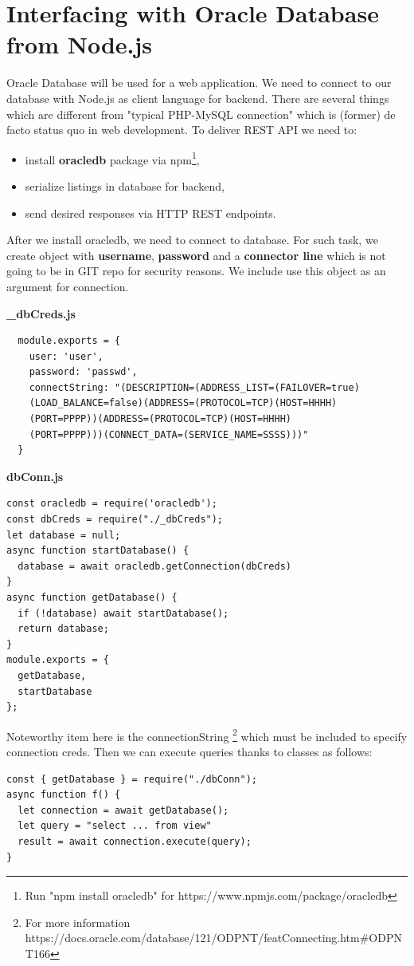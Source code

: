 \documentclass{article}
\begin{document}
\section{Interfacing with Oracle Database from Node.js}
Oracle Database will be used for a web application. We need to connect to our database with Node.js as client language for backend. There are several things which are different from "typical PHP-MySQL connection" which is (former) de facto status quo in web development. To deliver REST API we need to: 
\begin{itemize}
\item install \textbf{oracledb} package via npm\footnote{Run "npm install oracledb" for https://www.npmjs.com/package/oracledb},
\item serialize listings in database for backend,
\item send desired responses via HTTP REST endpoints.
\end{itemize}
After we install oracledb, we need to connect to database. For such task, we create object with \textbf{username}, \textbf{password} and a \textbf{connector line} which is not going to be in GIT repo for security reasons. We include use this object as an argument for connection. \par
\textbf{\_dbCreds.js}
\begin{lstlisting}
  module.exports = {
    user: 'user',
    password: 'passwd',
    connectString: "(DESCRIPTION=(ADDRESS_LIST=(FAILOVER=true)
    (LOAD_BALANCE=false)(ADDRESS=(PROTOCOL=TCP)(HOST=HHHH)
    (PORT=PPPP))(ADDRESS=(PROTOCOL=TCP)(HOST=HHHH)
    (PORT=PPPP)))(CONNECT_DATA=(SERVICE_NAME=SSSS)))"
  }
\end{lstlisting}  
\textbf{dbConn.js}
\begin{lstlisting}
const oracledb = require('oracledb');
const dbCreds = require("./_dbCreds");
let database = null;
async function startDatabase() {
  database = await oracledb.getConnection(dbCreds)
}
async function getDatabase() {
  if (!database) await startDatabase();
  return database;
}
module.exports = {
  getDatabase,
  startDatabase
};
\end{lstlisting}
Noteworthy item here is the connectionString \footnote{For more information https://docs.oracle.com/database/121/ODPNT/featConnecting.htm\#ODPNT166} which must be included to specify connection creds. Then we can execute queries thanks to classes as follows:
\begin{lstlisting}
const { getDatabase } = require("./dbConn");
async function f() {
  let connection = await getDatabase();
  let query = "select ... from view"
  result = await connection.execute(query);
}
\end{lstlisting}
\end{document}
